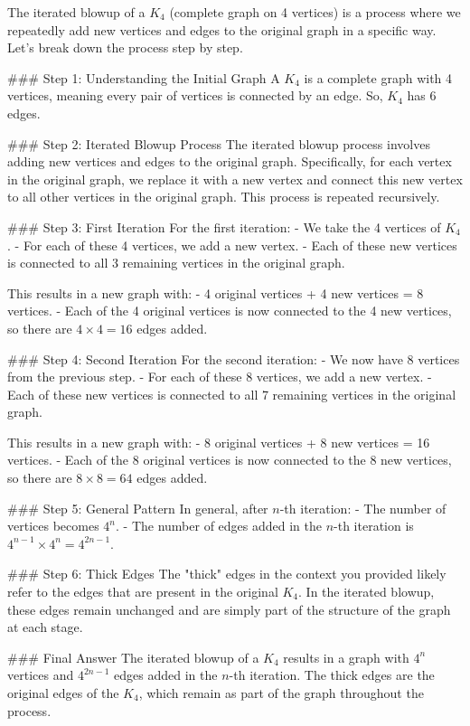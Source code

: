 The iterated blowup of a \( K_4 \) (complete graph on 4 vertices) is a process where we repeatedly add new vertices and edges to the original graph in a specific way. Let's break down the process step by step.

### Step 1: Understanding the Initial Graph
A \( K_4 \) is a complete graph with 4 vertices, meaning every pair of vertices is connected by an edge. So, \( K_4 \) has 6 edges.

### Step 2: Iterated Blowup Process
The iterated blowup process involves adding new vertices and edges to the original graph. Specifically, for each vertex in the original graph, we replace it with a new vertex and connect this new vertex to all other vertices in the original graph. This process is repeated recursively.

### Step 3: First Iteration
For the first iteration:
- We take the 4 vertices of \( K_4 \).
- For each of these 4 vertices, we add a new vertex.
- Each of these new vertices is connected to all 3 remaining vertices in the original graph.

This results in a new graph with:
- 4 original vertices + 4 new vertices = 8 vertices.
- Each of the 4 original vertices is now connected to the 4 new vertices, so there are \( 4 \times 4 = 16 \) edges added.

### Step 4: Second Iteration
For the second iteration:
- We now have 8 vertices from the previous step.
- For each of these 8 vertices, we add a new vertex.
- Each of these new vertices is connected to all 7 remaining vertices in the original graph.

This results in a new graph with:
- 8 original vertices + 8 new vertices = 16 vertices.
- Each of the 8 original vertices is now connected to the 8 new vertices, so there are \( 8 \times 8 = 64 \) edges added.

### Step 5: General Pattern
In general, after \( n \)-th iteration:
- The number of vertices becomes \( 4^n \).
- The number of edges added in the \( n \)-th iteration is \( 4^{n-1} \times 4^n = 4^{2n-1} \).

### Step 6: Thick Edges
The "thick" edges in the context you provided likely refer to the edges that are present in the original \( K_4 \). In the iterated blowup, these edges remain unchanged and are simply part of the structure of the graph at each stage.

### Final Answer
The iterated blowup of a \( K_4 \) results in a graph with \( 4^n \) vertices and \( 4^{2n-1} \) edges added in the \( n \)-th iteration. The thick edges are the original edges of the \( K_4 \), which remain as part of the graph throughout the process.